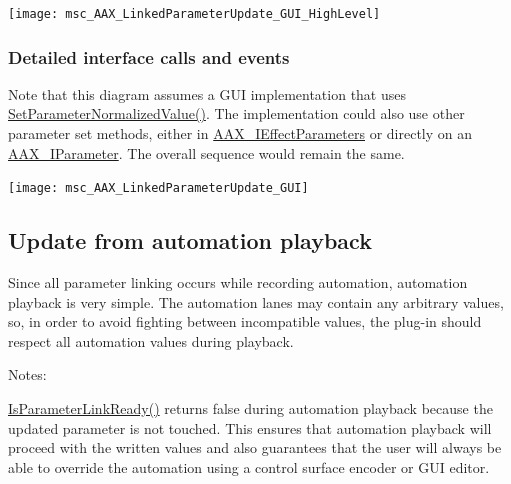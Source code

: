 \begin{DoxyImage}
\texttt{[image: msc\_AAX\_LinkedParameterUpdate\_GUI\_HighLevel]}
\end{DoxyImage}
 \hypertarget{a00825_linkedParameters_sequences_user_gui_detail}{}\subsubsection{Detailed interface calls and events}\label{a00825_linkedParameters_sequences_user_gui_detail}
Note that this diagram assumes a G\+UI implementation that uses \mbox{\hyperlink{a01669_a368b0f5a761d1eda4c41b420f153a077}{Set\+Parameter\+Normalized\+Value()}}. The implementation could also use other parameter set methods, either in \mbox{\hyperlink{a01825}{A\+A\+X\+\_\+\+I\+Effect\+Parameters}} or directly on an \mbox{\hyperlink{a01857}{A\+A\+X\+\_\+\+I\+Parameter}}. The overall sequence would remain the same.


\begin{DoxyImage}
\texttt{[image: msc\_AAX\_LinkedParameterUpdate\_GUI]}
\end{DoxyImage}
 \hypertarget{a00825_linkedParameters_sequences_automation}{}\subsection{Update from automation playback}\label{a00825_linkedParameters_sequences_automation}
Since all parameter linking occurs while recording automation, automation playback is very simple. The automation lanes may contain any arbitrary values, so, in order to avoid fighting between incompatible values, the plug-\/in should respect all automation values during playback.

Notes\+:
\begin{DoxyEnumerate}
\item \mbox{\hyperlink{a01481_adf4d2d6060bf3e13619838cea8b59865}{Is\+Parameter\+Link\+Ready()}} returns {\ttfamily false} during automation playback because the updated parameter is not touched. This ensures that automation playback will proceed with the written values and also guarantees that the user will always be able to override the automation using a control surface encoder or G\+UI editor.
\end{DoxyEnumerate}


